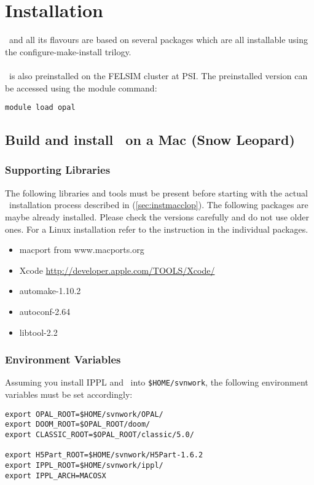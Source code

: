 \chapter{Installation}
\label{chp:installation}
\opal\ and all its flavours are based on several packages which are all installable using the configure-make-install trilogy. \\ \\
\opal\ is also preinstalled on the FELSIM cluster at PSI. The preinstalled version can be accessed 
using the module command: 
\begin{footnotesize}
\begin{verbatim}
module load opal
\end{verbatim}
\end{footnotesize}

\section{Build and install \opal\ on a Mac (Snow Leopard)}
\subsection{Supporting Libraries}
The following libraries and tools must be present before starting with the actual \opal\ installation process described in (\ref{sec:instmacclop}).
The following packages are maybe already installed. Please check the versions carefully and do not use older ones. For a Linux installation
refer to the instruction in the individual packages. 
\begin{itemize}
\item macport from www.macports.org
\item Xcode \url{http://developer.apple.com/TOOLS/Xcode/}
\item automake-1.10.2                
\item autoconf-2.64
\item libtool-2.2           
\end {itemize}


\subsection{Environment Variables} \label{subsec:envvar}
Assuming you install IPPL and \opal\ into {\tt \$HOME/svnwork}, the following 
environment variables must be set accordingly:
\begin{footnotesize}
\begin{verbatim}
export OPAL_ROOT=$HOME/svnwork/OPAL/
export DOOM_ROOT=$OPAL_ROOT/doom/
export CLASSIC_ROOT=$OPAL_ROOT/classic/5.0/

export H5Part_ROOT=$HOME/svnwork/H5Part-1.6.2
export IPPL_ROOT=$HOME/svnwork/ippl/
export IPPL_ARCH=MACOSX
\end{verbatim}
\end{footnotesize}


